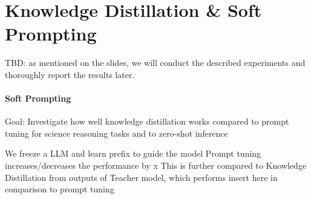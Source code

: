 \documentclass{article}
\begin{document}

\section{Knowledge Distillation \& Soft Prompting}
TBD: as mentioned on the slides, we will conduct the described experiments and thoroughly report the results later.

\paragraph{Soft Prompting}
Goal: Investigate how well knowledge distillation works compared to prompt tuning for science reasoning tasks and to zero-shot inference

We freeze a LLM and learn prefix to guide the model
Prompt tuning increases/decreases the performance by {x}%
This is further compared to Knowledge Distillation from outputs of Teacher model, which performs {insert here} in comparison to prompt tuning
\end{document}
